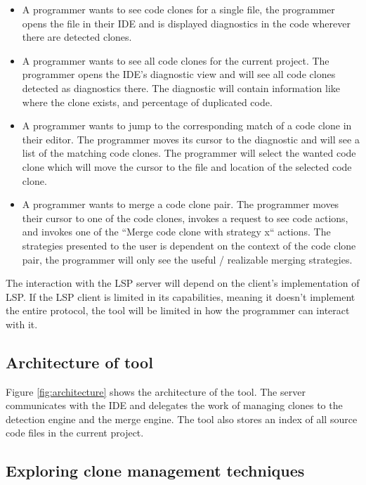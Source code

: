 \documentclass[12pt]{article}
\begin{document}
\begin{itemize}
	\item A programmer wants to see code clones for a single file, the
	      programmer opens the file in their IDE and is displayed diagnostics in the code
	      wherever there are detected clones.

	\item A programmer wants to see all code clones for the current project. The
	      programmer opens the IDE's diagnostic view and will see all code clones detected
	      as diagnostics there. The diagnostic will contain information like where the clone
	      exists, and percentage of duplicated code.

	\item A programmer wants to jump to the corresponding match of a code clone in their
	      editor. The programmer moves its cursor to the diagnostic and will see a list of
	      the matching code clones. The programmer will select the wanted code clone which
          will move the cursor to the file and location of the selected code clone.

	\item A programmer wants to merge a code clone pair. The programmer moves their cursor
	      to one of the code clones, invokes a request to see code actions, and invokes one
	      of the ``Merge code clone with strategy x`` actions. The strategies presented to
	      the user is dependent on the context of the code clone pair, the programmer will
	      only see the useful / realizable merging strategies.
\end{itemize}

The interaction with the LSP server will depend on the client's implementation of LSP. If
the LSP client is limited in its capabilities, meaning it doesn't implement the entire
protocol, the tool will be limited in how the programmer can interact with it.

\subsection{Architecture of tool}

Figure \ref{fig:architecture} shows the architecture of the tool. The server communicates
with the IDE and delegates the work of managing clones to the detection engine and the
merge engine. The tool also stores an index of all source code files in the current project.

\subsection{Exploring clone management techniques}
\end{document}
